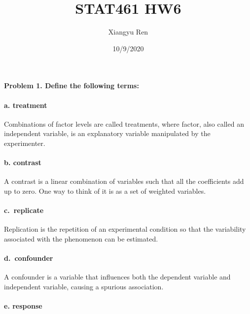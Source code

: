 \documentclass[
]{article}
\title{STAT461 HW6}
\author{Xiangyu Ren}
\date{10/9/2020}
\begin{document}
\maketitle

\hypertarget{problem-1.-define-the-following-terms}{%
\paragraph{Problem 1. Define the following
terms:}\label{problem-1.-define-the-following-terms}}

\hypertarget{a.-treatment}{%
\paragraph{a. treatment}\label{a.-treatment}}

Combinations of factor levels are called treatments, where factor, also
called an independent variable, is an explanatory variable manipulated
by the experimenter.

\hypertarget{b.-contrast}{%
\paragraph{b. contrast}\label{b.-contrast}}

A contrast is a linear combination of variables such that all the
coefficients add up to zero. One way to think of it is as a set of
weighted variables.

\hypertarget{c.-replicate}{%
\paragraph{c.~replicate}\label{c.-replicate}}

Replication is the repetition of an experimental condition so that the
variability associated with the phenomenon can be estimated.

\hypertarget{d.-confounder}{%
\paragraph{d.~confounder}\label{d.-confounder}}

A confounder is a variable that influences both the dependent variable
and independent variable, causing a spurious association.

\hypertarget{e.-response}{%
\paragraph{e. response}\label{e.-response}}
\end{document}
